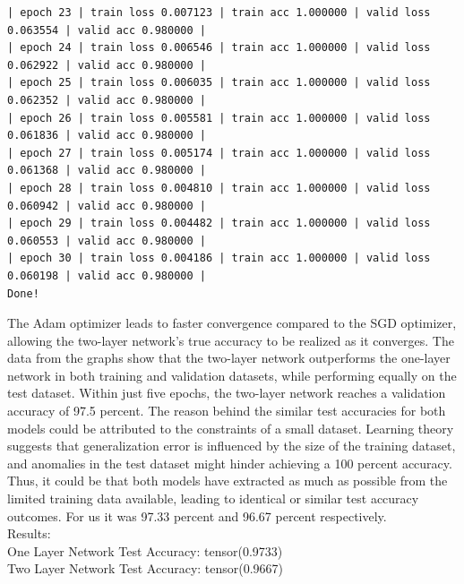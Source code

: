 \documentclass[10pt]{article}
\begin{document}
\begin{verbatim}
| epoch 23 | train loss 0.007123 | train acc 1.000000 | valid loss 0.063554 | valid acc 0.980000 |
| epoch 24 | train loss 0.006546 | train acc 1.000000 | valid loss 0.062922 | valid acc 0.980000 |
| epoch 25 | train loss 0.006035 | train acc 1.000000 | valid loss 0.062352 | valid acc 0.980000 |
| epoch 26 | train loss 0.005581 | train acc 1.000000 | valid loss 0.061836 | valid acc 0.980000 |
| epoch 27 | train loss 0.005174 | train acc 1.000000 | valid loss 0.061368 | valid acc 0.980000 |
| epoch 28 | train loss 0.004810 | train acc 1.000000 | valid loss 0.060942 | valid acc 0.980000 |
| epoch 29 | train loss 0.004482 | train acc 1.000000 | valid loss 0.060553 | valid acc 0.980000 |
| epoch 30 | train loss 0.004186 | train acc 1.000000 | valid loss 0.060198 | valid acc 0.980000 |
Done!
\end{verbatim}

The Adam optimizer leads to faster convergence compared to the SGD optimizer, allowing the two-layer network's true accuracy to be realized as it converges. The data from the graphs show that the two-layer network outperforms the one-layer network in both training and validation datasets, while performing equally on the test dataset. Within just five epochs, the two-layer network reaches a validation accuracy of 97.5 percent. The reason behind the similar test accuracies for both models could be attributed to the constraints of a small dataset. Learning theory suggests that generalization error is influenced by the size of the training dataset, and anomalies in the test dataset might hinder achieving a 100 percent accuracy. Thus, it could be that both models have extracted as much as possible from the limited training data available, leading to identical or similar test accuracy outcomes. For us it was 97.33 percent and 96.67 percent respectively. \\

Results:\\
One Layer Network Test Accuracy:  tensor(0.9733)\\
Two Layer Network Test Accuracy:  tensor(0.9667)\\
\end{document}
